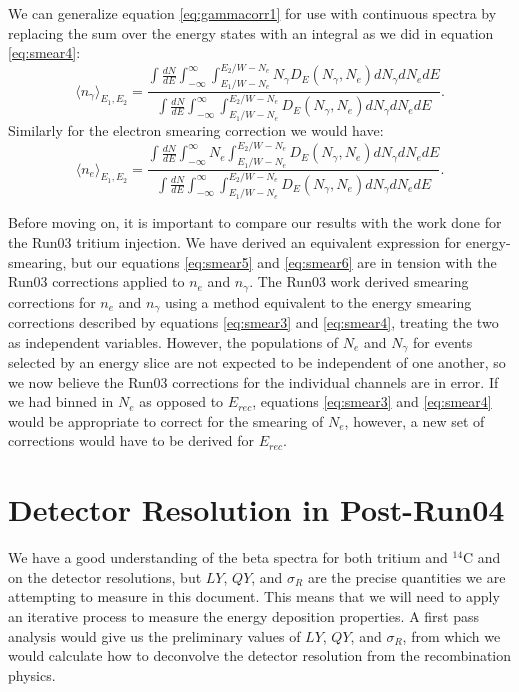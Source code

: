 We can generalize equation \ref{eq:gammacorr1} for use with continuous spectra by replacing the sum over the energy states with an integral as we did in equation \ref{eq:smear4}:
\begin{equation}\label{eq:smear5}
\langle n_{\gamma} \rangle_{E_1,E_2}=\frac{\int \frac{dN}{dE} \int_{-\infty}^{\infty} \int_{E_1/W-N_e}^{E_2/W-N_e} N_{\gamma} D_{E}(N_{\gamma},N_{e})dN_{\gamma}dN_{e}dE}{\int \frac{dN}{dE} \int_{-\infty}^{\infty} \int_{E_1/W-N_e}^{E_2/W-N_e} D_{E}(N_{\gamma},N_{e})dN_{\gamma}dN_{e}dE}.
\end{equation}
Similarly for the electron smearing correction we would have:
\begin{equation}\label{eq:smear6}
\langle n_e \rangle_{E_1,E_2}=\frac{\int \frac{dN}{dE} \int_{-\infty}^{\infty}N_{e}  \int_{E_1/W-N_e}^{E_2/W-N_e} D_{E}(N_{\gamma},N_{e})dN_{\gamma}dN_{e}dE}{\int \frac{dN}{dE} \int_{-\infty}^{\infty} \int_{E_1/W-N_e}^{E_2/W-N_e} D_{E}(N_{\gamma},N_{e})dN_{\gamma}dN_{e}dE}.
\end{equation}

Before moving on, it is important to compare our results with the work done for the Run03 tritium injection\cite{lux_tritium,attila}. We have derived an equivalent expression for energy-smearing, but our equations \ref{eq:smear5} and \ref{eq:smear6} are in tension with the Run03 corrections applied to $n_e$ and $n_{\gamma}$.  The Run03 work derived smearing corrections for $n_e$ and $n_{\gamma}$ using a method equivalent to the energy smearing corrections described by equations \ref{eq:smear3} and \ref{eq:smear4}, treating the two as independent variables. However, the populations of $N_e$ and $N_{\gamma}$ for events selected by an energy slice are not expected to be independent of one another, so we now believe the Run03 corrections for the individual channels are in error. If we had binned in $N_{e}$ as opposed to $E_{rec}$, equations \ref{eq:smear3} and \ref{eq:smear4} would be appropriate to correct for the smearing of  $N_{e}$, however, a new set of corrections would have to be derived for $E_{rec}$.



\section{Detector Resolution in Post-Run04}
We have a good understanding of the beta spectra for both tritium and $^{14}$C and on the detector resolutions, but $LY$, $QY$, and $\sigma_R$ are the precise quantities we are attempting to measure in this document. This means that we will need to apply an iterative process to measure the energy deposition properties. A first pass analysis would give us the preliminary values of $LY$, $QY$, and $\sigma_R$, from which we would calculate how to deconvolve the detector resolution from the recombination physics.

